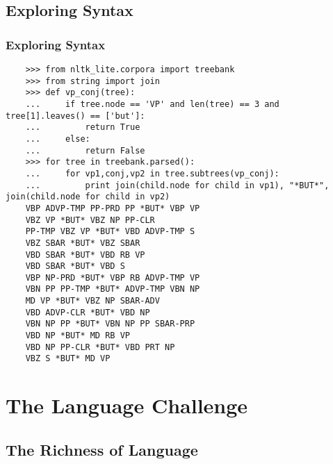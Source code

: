 \documentclass{beamer}             %
\begin{document}
\subsection{Exploring Syntax}
\begin{frame}[fragile]
  \frametitle{Exploring Syntax}
  \tiny
\begin{verbatim}
    >>> from nltk_lite.corpora import treebank
    >>> from string import join
    >>> def vp_conj(tree):
    ...     if tree.node == 'VP' and len(tree) == 3 and tree[1].leaves() == ['but']:
    ...         return True
    ...     else:
    ...         return False
    >>> for tree in treebank.parsed():
    ...     for vp1,conj,vp2 in tree.subtrees(vp_conj):
    ...         print join(child.node for child in vp1), "*BUT*", join(child.node for child in vp2)
    VBP ADVP-TMP PP-PRD PP *BUT* VBP VP
    VBZ VP *BUT* VBZ NP PP-CLR
    PP-TMP VBZ VP *BUT* VBD ADVP-TMP S
    VBZ SBAR *BUT* VBZ SBAR
    VBD SBAR *BUT* VBD RB VP
    VBD SBAR *BUT* VBD S
    VBP NP-PRD *BUT* VBP RB ADVP-TMP VP
    VBN PP PP-TMP *BUT* ADVP-TMP VBN NP
    MD VP *BUT* VBZ NP SBAR-ADV
    VBD ADVP-CLR *BUT* VBD NP
    VBN NP PP *BUT* VBN NP PP SBAR-PRP
    VBD NP *BUT* MD RB VP
    VBD NP PP-CLR *BUT* VBD PRT NP
    VBZ S *BUT* MD VP
\end{verbatim}
\end{frame}

\section{The Language Challenge}

\subsection{The Richness of Language}
\end{document}
